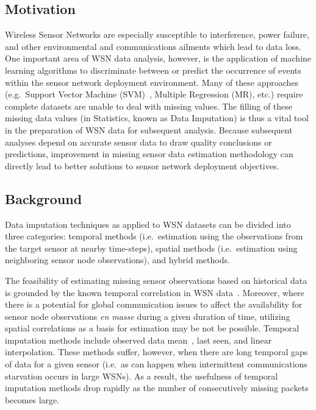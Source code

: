 \subsection{Motivation }
Wireless Sensor Networks are especially susceptible to interference, power failure, and other environmental and communications ailments which lead to data loss.
One important area of WSN data analysis, however, is the application of machine learning algorithms to discriminate between or predict the occurrence of events within the sensor network deployment environment.
Many of these approaches (e.g.\ Support Vector Machine (SVM)~\cite{vapnik2000nature}, Multiple Regression (MR), etc.) require complete datasets are unable to deal with missing values.
The filling of these missing data values (in Statistics, known as Data Imputation) is thus a vital tool in the preparation of WSN data for subsequent analysis. 
Because subsequent analyses depend on accurate sensor data to draw quality conclusions or predictions, improvement in missing sensor data estimation methodology can directly lead to better solutions to sensor network deployment objectives.

\subsection{Background }
Data imputation techniques as applied to WSN datasets can be divided into three categories:
temporal methods (i.e.\ estimation using the observations from the target sensor at nearby time-steps), 
spatial methods (i.e.\ estimation using neighboring sensor node observations), 
and hybrid methods.

The feasibility of estimating missing sensor observations based on historical data is grounded by the known temporal correlation in WSN data~\cite{akyildiz2004exploiting}.
Moreover, where there is a potential for global communication issues to affect the availability for sensor node observations \emph{en masse} during a given duration of time, utilizing spatial correlations as a basis for estimation may be not be possible.
Temporal imputation methods include observed data mean~\cite{madden2005tinydb,setz2009combining}, last seen, and linear interpolation.
These methods suffer, however, when there are long temporal gaps of data for a given sensor (i.e.\ as can happen when intermittent communications starvation occurs in large WSNs).
As a result, the usefulness of temporal imputation methods drop rapidly as the number of consecutively missing packets becomes large.


